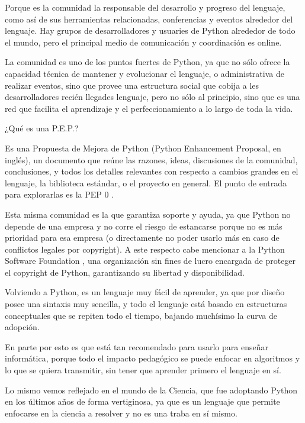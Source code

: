 Porque es la comunidad la responsable del desarrollo y progreso del lenguaje, como así de sus herramientas relacionadas, conferencias y eventos alrededor del lenguaje. Hay grupos de desarrolladores y usuaries de Python alrededor de todo el mundo, pero el principal medio de comunicación y coordinación es online.

La comunidad es uno de los puntos fuertes de Python, ya que no sólo ofrece la capacidad técnica de mantener y evolucionar el lenguaje, o administrativa de realizar eventos, sino que provee una estructura social que cobija a les desarrolladores recién llegades lenguaje, pero no sólo al principio, sino que es una red que facilita el aprendizaje y el perfeccionamiento a lo largo de toda la vida.

\begin{info}
¿Qué es una P.E.P.? 

Es una Propuesta de Mejora de Python (Python Enhancement Proposal, en inglés), un documento que reúne las razones, ideas, discusiones de la comunidad, conclusiones, y todos los detalles relevantes con respecto a cambios grandes en el lenguaje, la biblioteca estándar, o el proyecto en general. El punto de entrada para explorarlas es la PEP 0 \cite{pep0}.
\end{info}

Esta misma comunidad es la que garantiza soporte y ayuda, ya que Python no depende de una empresa y no corre el riesgo de estancarse porque no es más prioridad para esa empresa (o directamente no poder usarlo más en caso de conflictos legales por copyright). A este respecto cabe mencionar a la Python Software Foundation \cite{psf}, una organización sin fines de lucro encargada de proteger el copyright de Python, garantizando su libertad y disponibilidad.

Volviendo a Python, es un lenguaje muy fácil de aprender, ya que por diseño posee una sintaxis muy sencilla, y todo el lenguaje está basado en estructuras conceptuales que se repiten todo el tiempo, bajando muchísimo la curva de adopción.

En parte por esto es que está tan recomendado para usarlo para enseñar informática, porque todo el impacto pedagógico se puede enfocar en algoritmos y lo que se quiera transmitir, sin tener que aprender primero el lenguaje en sí.

Lo mismo vemos reflejado en el mundo de la Ciencia, que fue adoptando Python en los últimos años de forma vertiginosa, ya que es un lenguaje que permite enfocarse en la ciencia a resolver y no es una traba en sí mismo.

